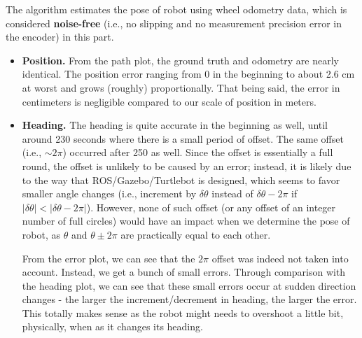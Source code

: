 \documentclass{article} %
\begin{document}
The algorithm estimates the pose of robot using wheel odometry data, which is considered \textbf{noise-free} (i.e., no slipping and no measurement precision error in the encoder) in this part. 
\begin{itemize}
    \item \textbf{Position.} From the path plot, the ground truth and odometry are nearly identical. The position error ranging from 0 in the beginning to about 2.6 cm at worst and grows (roughly) proportionally. That being said, the error in centimeters is negligible compared to our scale of position in meters.

    \item \textbf{Heading.} The heading is quite accurate in the beginning as well, until around 230 seconds where there is a small period of offset. The same offset (i.e., $\sim2\pi$) occurred after 250 as well. Since the offset is essentially a full round, the offset is unlikely to be caused by an error; instead, it is likely due to the way that ROS/Gazebo/Turtlebot is designed, which seems to favor smaller angle changes (i.e., increment by $\delta\theta$ instead of $\delta\theta-2\pi$ if $|\delta\theta|<|\delta\theta-2\pi|$). However, none of such offset (or any offset of an integer number of full circles) would have an impact when we determine the pose of robot, as $\theta$ and $\theta\pm2\pi$ are practically equal to each other.
    
    From the error plot, we can see that the $2\pi$ offset was indeed not taken into account. Instead, we get a bunch of small errors. Through comparison with the heading plot, we can see that these small errors occur at sudden direction changes - the larger the increment/decrement in heading, the larger the error. This totally makes sense as the robot might needs to overshoot a little bit, physically, when as it changes its heading.
\end{itemize}

\end{document}
